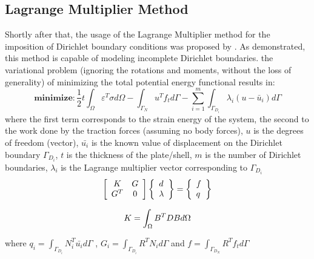 \documentclass[12pt, a4paper]{report}
\begin{document}
\subsection{Lagrange Multiplier Method} Shortly after that, the usage of the Lagrange Multiplier method for the imposition of Dirichlet boundary conditions was proposed by \cite{lagDBC}. As demonstrated, this method is capable of modeling incomplete Dirichlet boundaries. the variational problem (ignoring the rotations and moments, without the loss of generality) of minimizing the total potential energy functional results in:
\begin{equation}
   \textbf{minimize}: \frac{1}{2} t \int_{\Omega} \varepsilon^T \sigma d \Omega -\int_{\Gamma_N} u^T f_t d \Gamma-\sum_{i=1}^m \int_{\Gamma_{D_i}} \lambda_i\left(u-\bar{u}_i\right) d \Gamma
\end{equation}
where the first term corresponds to the strain energy of the system, the second to the work done by the traction forces (assuming no body forces), $u$ is the degrees of freedom (vector), $\bar{u_i}$ is the known value of displacement on the Dirichlet boundary $\Gamma_{D_i}$, $t$ is the thickness of the plate/shell, $m$ is the number of Dirichlet boundaries, $\lambda_i$ is the Lagrange multiplier vector corresponding to $\Gamma_{D_i}$
\begin{equation}
{\left[\begin{array}{cc}
K & G \\
G^T & 0
\end{array}\right]\left\{\begin{array}{l}
d \\
\lambda
\end{array}\right\}=\left\{\begin{array}{l}
f \\
q
\end{array}\right\}} \\
\end{equation}

\begin{equation}
K=\int_{\Omega} B^T D B d \Omega \\
\end{equation}

where $q_i = \int_{\Gamma_{D_i}} N_i^T \bar{u_i}d \Gamma$ , $G_i=\int_{\Gamma_{D_i}} R^T N_i d \Gamma$ and $f= \int_{\Gamma_{D_N}} R^T f_t d \Gamma$
\end{document}
